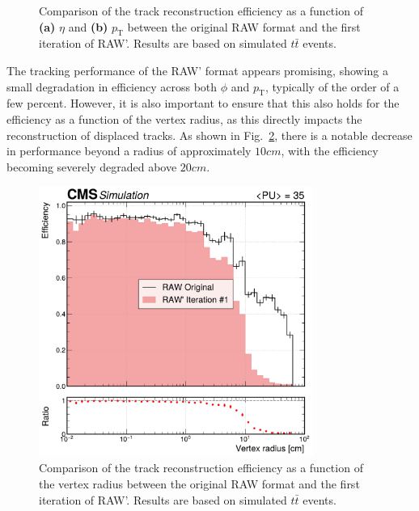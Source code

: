 \begin{figure}[h]
\begin{subfigure}[b]{0.49\textwidth}
            \caption{}
        \end{subfigure}
    \caption[Comparison of the track reconstruction efficiency as a function of $\eta$ and $p_\mathrm{T}$ between the original RAW format and the first iteration of RAW'.]{Comparison of the track reconstruction efficiency as a function of \textbf{(a)} $\eta$ and \textbf{(b)} $p_\mathrm{T}$ between the original RAW format and the first iteration of RAW'. Results are based on simulated $t\bar{t}$ events.} 
    \label{Figure:Chapter5_TrackingPerformance_1}
\end{figure}

The tracking performance of the RAW' format appears promising, showing a small degradation in efficiency across both $\phi$ and $p_\mathrm{T}$, typically of the order of a few percent. However, it is also important to ensure that this also holds for the efficiency as a function of the vertex radius, as this directly impacts the reconstruction of displaced tracks. As shown in Fig.~\ref{Figure:Chapter5_TrackingPerformance_vertexPos_1}, there is a notable decrease in performance beyond a radius of approximately $10\unit{cm}$, with the efficiency becoming severely degraded above $20\unit{cm}$. 

\begin{figure}[h]
\centering
\includegraphics[width=0.8\textwidth]{Figures/Chapter5/efficiency_comparison_1_vertpos.pdf}
\caption[Comparison of the track reconstruction efficiency as a function of the vertex radius between the original RAW format and the first iteration of RAW'.]{Comparison of the track reconstruction efficiency as a function of the vertex radius between the original RAW format and the first iteration of RAW'. Results are based on simulated $t\bar{t}$ events.} 
\label{Figure:Chapter5_TrackingPerformance_vertexPos_1}
\end{figure}

